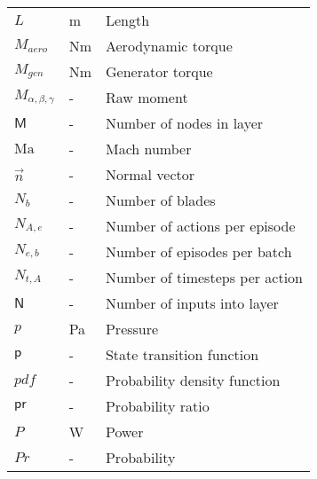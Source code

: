 \begin{longtable}{p{5cm}p{4cm}p{5cm}}
    $L$						& \si{m}		& Length \\
    $M_{aero}$				& \si{Nm}		& Aerodynamic torque \\
    $M_{gen}$				& \si{Nm}		& Generator torque \\
    $M_{\alpha, \beta, \gamma}$	& \si{-}	& Raw moment \\
    $\mathsf{M}$			& \si{-}		& Number of nodes in layer \\
    $\mathrm{Ma}$			& \si{-}		& Mach number \\
    $\vec{n}$ 				& \si{-}		& Normal vector \\
    $N_b$					& \si{-}		& Number of blades \\
    $N_{A,e}$				& \si{-}		& Number of actions per episode \\
    $N_{e,b}$				& \si{-}		& Number of episodes per batch \\
    $N_{t,A}$				& \si{-}		& Number of timesteps per action \\
    $\mathsf{N}$			& \si{-}		& Number of inputs into layer \\
    $p$                     & \si{Pa}     & Pressure \\
    $\mathsf{p}$			& \si{-}		& State transition function \\
    $pdf$					& \si{-}		& Probability density function \\
    $\mathsf{pr}$			& \si{-}		& Probability ratio \\
    $P$						& \si{W}		& Power \\
    $Pr$					& \si{-}		& Probability \\

\end{longtable}
